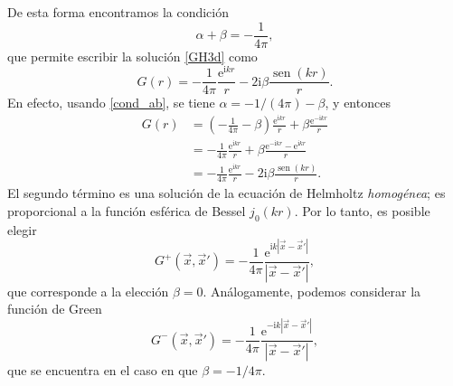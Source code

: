 \documentclass[11pt]{article}
\newcommand{\ii}{\mathrm{i}}
\newcommand{\e}{\mathrm{e}}
\newcommand{\sen}{\operatorname{sen}}
\begin{document}
De esta forma encontramos la condición
\begin{equation}\label{cond_ab}
\alpha+\beta=-\frac{1}{4\pi},
\end{equation}
que permite escribir la solución \eqref{GH3d} como
\begin{equation}\label{GH3d2}
G(r)=-\frac{1}{4\pi}\frac{\e^{\ii kr}}{r}-2\ii\beta\frac{\sen(kr)}{r}.
\end{equation}
En efecto, usando \eqref{cond_ab}, se tiene $\alpha=-1/(4\pi)-\beta$, y entonces
\begin{align*}
G(r)
&=\left(-\frac{1}{4\pi}-\beta\right)\frac{\e^{\ii kr}}{r}+\beta\frac{\e^{-\ii kr}}{r}\\
&=-\frac{1}{4\pi}\frac{\e^{\ii kr}}{r}+\beta\frac{\e^{-\ii kr}-\e^{\ii kr}}{r}\\
&=-\frac{1}{4\pi}\frac{\e^{\ii kr}}{r}-2\ii\beta\frac{\sen(kr)}{r}.
\end{align*}
El segundo término es una solución de la ecuación de Helmholtz \textit{homogénea}; es proporcional a la función esférica de Bessel $j_0(kr)$. Por lo tanto, es posible elegir
\begin{equation}\label{GH3d3}
\boxed{G^{+}(\vec{x},\vec{x}')=-\frac{1}{4\pi}\frac{\e^{\ii k|\vec{x}-\vec{x}'|}}{|\vec{x}-\vec{x}'|},}
\end{equation}
que corresponde a la elección $\beta=0$. Análogamente, podemos considerar la función de Green
\begin{equation}\label{GH3d4}
G^{-}(\vec{x},\vec{x}')=-\frac{1}{4\pi}\frac{\e^{-\ii k|\vec{x}-\vec{x}'|}}{|\vec{x}-\vec{x}'|},
\end{equation}
que se encuentra en el caso en que $\beta=-1/4\pi$.
\end{document}
